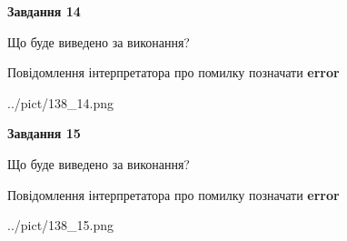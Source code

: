 \documentclass[11pt, ukrainian]{article}
\begin{document}
{\begin {large}
{\begin {center}\textbf{Завдання 14}\end {center}}\par
Що буде виведено за виконання? \par
Повідомлення інтерпретатора про помилку позначати \textbf{error}

\begin{center}
	{../pict/138_14.png}
\end{center}
\newpage

{\begin {center}\textbf{Завдання 15}\end {center}}\par
Що буде виведено за виконання? \par
Повідомлення інтерпретатора про помилку позначати \textbf{error}

\begin{center}
	{../pict/138_15.png}
\end{center}
\newpage

\end {large}}
\end{document}
